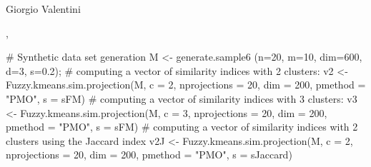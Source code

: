 \documentclass{article}
\begin{document}
\begin{Author}\relax
Giorgio Valentini 
\end{Author}
\begin{SeeAlso}\relax
{}, 
\end{SeeAlso}
\begin{Examples}
\begin{ExampleCode}
# Synthetic data set generation
M <- generate.sample6 (n=20, m=10, dim=600, d=3, s=0.2);
# computing a vector of similarity indices with 2 clusters:
v2 <- Fuzzy.kmeans.sim.projection(M, c = 2, nprojections = 20, dim = 200, 
                                  pmethod = "PMO", s = sFM)
# computing a vector of similarity indices with 3 clusters:
v3 <- Fuzzy.kmeans.sim.projection(M, c = 3, nprojections = 20, dim = 200, 
                                  pmethod = "PMO", s = sFM)
# computing a vector of similarity indices with 2 clusters using the Jaccard index
v2J <- Fuzzy.kmeans.sim.projection(M, c = 2, nprojections = 20, dim = 200, 
                                   pmethod = "PMO", s = sJaccard)
\end{ExampleCode}
\end{Examples}
\end{document}
